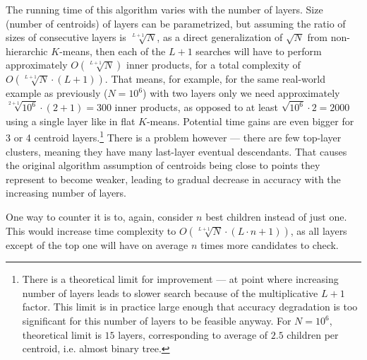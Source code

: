 The running time of this algorithm varies with the number of layers. Size (number of
centroids) of layers can be parametrized, but assuming
the ratio of sizes of consecutive layers is $ \sqrt[L+1]{N} $, as a direct generalization
of $ \sqrt{N} $ from non-hierarchic $K$-means,
then each of the $ L + 1 $ searches will have to perform approximately
$ O(\sqrt[L+1]{N}) $ inner products, for a total complexity of
$ O(\sqrt[L+1]{N} \cdot (L + 1)) $. That means, for example, for the same real-world
example as previously ($ N=10^6 $) with two layers only we need approximately
$ \sqrt[2+1]{10^6} \cdot (2 + 1) = 300 $ inner products, as opposed
to at least $ \sqrt{10^6} \cdot 2 = 2000 $ using a single layer like in flat $K$-means.
Potential time gains are even bigger for 3 or 4 centroid layers.\footnote{
There is a theoretical limit for improvement --- at point where increasing
number of layers leads to slower search because of the multiplicative $L+1$ factor.
This limit is in practice large enough that accuracy degradation is too 
significant for this number of layers to be feasible anyway. 
For $N=10^6$, theoretical limit is $15$ layers, corresponding to average 
of $2.5$ children per centroid, i.e. almost binary tree.
} There is a problem however --- there are few top-layer clusters,
meaning they have many last-layer eventual descendants. That causes the
original algorithm assumption of centroids being close to points they represent
to become weaker, leading to gradual decrease in accuracy with the increasing number of layers.


One way to counter it is to, again, consider $n$ best children instead of
just one. This would increase time complexity to 
$ O(\sqrt[L+1]{N} \cdot (L \cdot n + 1)) $, as all layers except of the top one
will have on average $n$ times more candidates to check.

